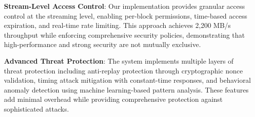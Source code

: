 \documentclass[conference]{IEEEtran}
\begin{document}

\textbf{Stream-Level Access Control}: Our implementation provides granular access control at the streaming level, enabling per-block permissions, time-based access expiration, and real-time rate limiting. This approach achieves 2,200 MB/s throughput while enforcing comprehensive security policies, demonstrating that high-performance and strong security are not mutually exclusive.

\textbf{Advanced Threat Protection}: The system implements multiple layers of threat protection including anti-replay protection through cryptographic nonce validation, timing attack mitigation with constant-time responses, and behavioral anomaly detection using machine learning-based pattern analysis. These features add minimal overhead while providing comprehensive protection against sophisticated attacks.
\end{document}
